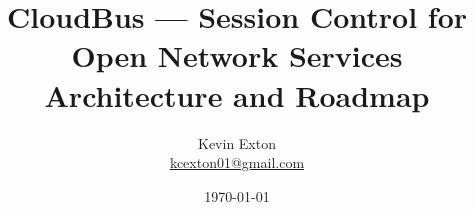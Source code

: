\title{CloudBus --- Session Control for Open Network Services\\
\normalsize Architecture and Roadmap}
\author[K. Exton]{
	\centering
	Kevin Exton\\
	\href{mailto:kcexton01@gmail.com}{\footnotesize kcexton01@gmail.com}
}
\date{\today}
\begin{frame}[plain]
	\titlepage
	\centering
\end{frame}